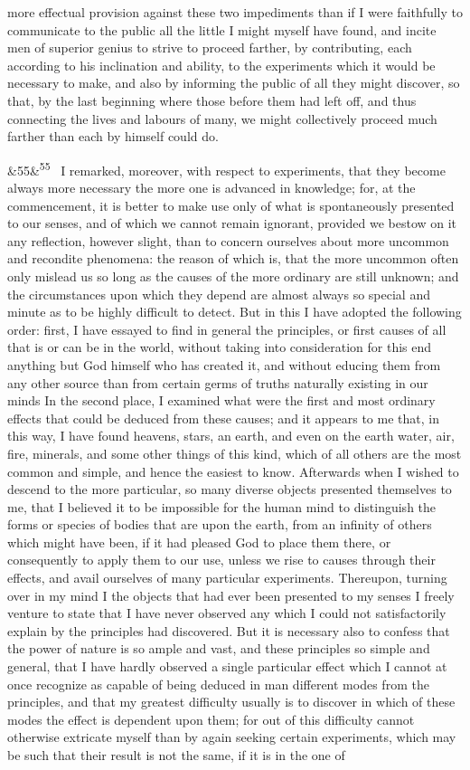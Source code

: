 \documentclass[12pt]{article}
\newcommand{\para}[1][]{\par\noindent\ifx&#1&\else\textsuperscript{\footnotesize #1}~\fi}
\begin{document}
more effectual provision against these two impediments than if I were faithfully to communicate to the public all the little I might myself have found, and incite men of superior genius to strive to proceed farther, by contributing, each according to his inclination and ability, to the experiments which it would be necessary to make, and also by informing the public of all they might discover, so that, by the last beginning where those before them had left off, and thus connecting the lives and labours of many, we might collectively proceed much farther than each by himself could do.

\para[55] I remarked, moreover, with respect to experiments, that they become always more necessary the more one is advanced in knowledge; for, at the commencement, it is better to make use only of what is spontaneously presented to our senses, and of which we cannot remain ignorant, provided we bestow on it any reflection, however slight, than to concern ourselves about more uncommon and recondite phenomena: the reason of which is, that the more uncommon often only mislead us so long as the causes of the more ordinary are still unknown; and the circumstances upon which they depend are almost always so special and minute as to be highly difficult to detect. But in this I have adopted the following order: first, I have essayed to find in general the principles, or first causes of all that is or can be in the world, without taking into consideration for this end anything but God himself who has created it, and without educing them from any other source than from certain germs of truths naturally existing in our minds In the second place, I examined what were the first and most ordinary effects that could be deduced from these causes; and it appears to me that, in this way, I have found heavens, stars, an earth, and even on the earth water, air, fire, minerals, and some other things of this kind, which of all others are the most common and simple, and hence the easiest to know. Afterwards when I wished to descend to the more particular, so many diverse objects presented themselves to me, that I believed it to be impossible for the human mind to distinguish the forms or species of bodies that are upon the earth, from an infinity of others which might have been, if it had pleased God to place them there, or consequently to apply them to our use, unless we rise to causes through their effects, and avail ourselves of many particular experiments. Thereupon, turning over in my mind I the objects that had ever been presented to my senses I freely venture to state that I have never observed any which I could not satisfactorily explain by the principles had discovered. But it is necessary also to confess that the power of nature is so ample and vast, and these principles so simple and general, that I have hardly observed a single particular effect which I cannot at once recognize as capable of being deduced in man different modes from the principles, and that my greatest difficulty usually is to discover in which of these modes the effect is dependent upon them; for out of this difficulty cannot otherwise extricate myself than by again seeking certain experiments, which may be such that their result is not the same, if it is in the one of 
\end{document}
